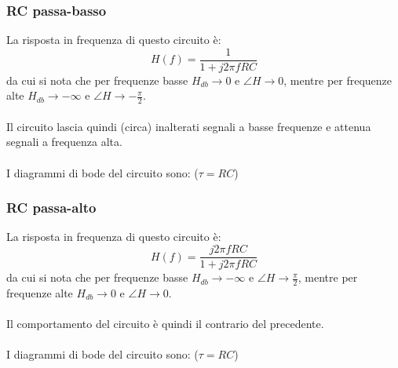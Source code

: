 \documentclass{article}
\begin{document}
\subsubsection{RC passa-basso}
La risposta in frequenza di questo circuito è:
$$H(f) = \frac{1}{1 + j2\pi f RC}$$
da cui si nota che per frequenze basse $H_{db}\rightarrow0$ e $\angle H\rightarrow0$, mentre per frequenze alte $H_{db}\rightarrow-\infty$ e $\angle H \rightarrow-\frac{\pi}{2}$.\\\\
Il circuito lascia quindi (circa) inalterati segnali a basse frequenze e attenua segnali a frequenza alta.\\\\
I diagrammi di bode del circuito sono:
($\tau = RC$)

\subsubsection{RC passa-alto}
La risposta in frequenza di questo circuito è:
$$H(f) = \frac{j2\pi f RC}{1 + j2\pi f RC}$$
da cui si nota che per frequenze basse $H_{db}\rightarrow-\infty$ e $\angle H\rightarrow\frac{\pi}{2}$, mentre per frequenze alte $H_{db}\rightarrow0$ e $\angle H \rightarrow0$.\\\\
Il comportamento del circuito è quindi il contrario del precedente.\\\\
I diagrammi di bode del circuito sono:
($\tau = RC$)



\newpage
\Index
\end{document}
